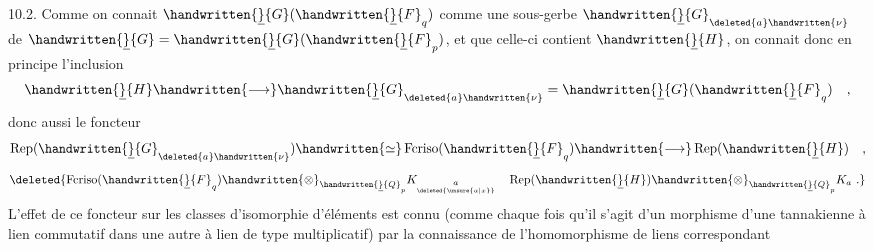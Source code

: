 10.2. Comme on connait $\handwritten{\underline}{G}(\handwritten{\underline}{F}_q)$ comme une sous-gerbe $\handwritten{\underline}{G}_{\deleted{a}\handwritten{\nu}}$ de $\handwritten{\underline}{G}=\handwritten{\underline}{G}(\handwritten{\underline}{F}_p)$, et que celle-ci contient $\handwritten{\underline}{H}$, on connait donc en principe l'inclusion
\[
\handwritten{\underline}{H}\handwritten{\longrightarrow}\handwritten{\underline}{G}_{\deleted{a}\handwritten{\nu}}=\handwritten{\underline}{G}(\handwritten{\underline}{F}_q)\quad ,
\]
donc aussi le foncteur
\[
\operatorname{Rep}(\handwritten{\underline}{G}_{\deleted{a}\handwritten{\nu}})\handwritten{\simeq}\operatorname{Fcriso}(\handwritten{\underline}{F}_q)\handwritten{\longrightarrow}\operatorname{Rep}(\handwritten{\underline}{H})\quad ,
\]
\[
\deleted{\operatorname{Fcriso}(\handwritten{\underline}{F}_q)\handwritten{\otimes}_{\handwritten{\underline}{Q}_p}K_{\underset{\deleted{\unsure{a|x}}}{a}}\quad\operatorname{Rep}(\handwritten{\underline}{H})\handwritten{\otimes}_{\handwritten{\underline}{Q}_p}K_a\ .}
\]
L'effet de ce foncteur sur les classes d'isomorphie d'éléments est connu (comme chaque fois qu'il s'agit d'un morphisme d'une   tannakienne à lien commutatif dans une autre à lien de type multiplicatif) par la connaissance de l'homomorphisme de liens correspondant

